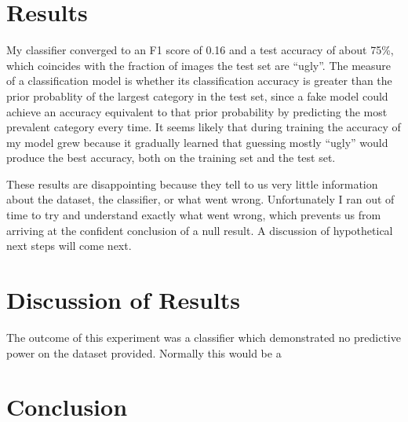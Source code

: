 \documentclass[midd]{thesis}
\begin{document}
\chapter{Results}

My classifier converged to an F1 score of 0.16 and a test accuracy of about 75\%, which coincides with the fraction of images the test set are ``ugly''. The measure of a classification model is whether its classification accuracy is greater than the prior probablity of the largest category in the test set, since a fake model could achieve an accuracy equivalent to that prior probability by predicting the most prevalent category every time. It seems likely that during training the accuracy of my model grew because it gradually learned that guessing mostly ``ugly'' would produce the best accuracy, both on the training set and the test set.

These results are disappointing because they tell to us very little information about the dataset, the classifier, or what went wrong. Unfortunately I ran out of time to try and understand exactly what went wrong, which prevents us from arriving at the confident conclusion of a null result. A discussion of hypothetical next steps will come next.



\chapter{Discussion of Results}

The outcome of this experiment was a classifier which demonstrated no predictive power on the dataset provided. Normally this would be a


\chapter{Conclusion}



\end{document}
